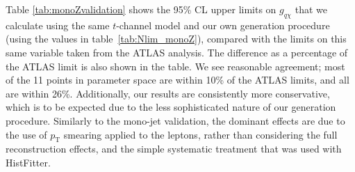 \begin{flushleft}
Table \ref{tab:monoZvalidation} shows the 95\% CL upper limits on $g_{q \chi}$ that we calculate using the same $t$-channel model and our own generation procedure (using the values in table~\ref{tab:Nlim_monoZ}), compared with the limits on this same variable taken from the ATLAS analysis. The difference as a percentage of the ATLAS limit is also shown in the table. We see reasonable agreement; most of the 11 points in parameter space are within 10\% of the ATLAS limits, and all are within 26\%. Additionally, our results are consistently more conservative, which is to be expected due to the less sophisticated nature of our generation procedure. Similarly to the mono-jet validation, the dominant effects are due to the use of $p_{\mathrm{T}}$ smearing applied to the leptons, rather than considering the full reconstruction effects, and the simple systematic treatment that was used with HistFitter.

\end{flushleft}

\iffalse

\subsection{Mono-W/Z Channel}
\label{monoWZ_validation}
\begin{flushleft}
\comm{Johanna, please put your validation results here.}
\end{flushleft}

\fi
